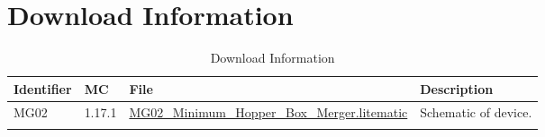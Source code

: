 \documentclass[10pt]{datasheet}
\begin{document}
\section{Download Information}
\begin{table}[H]
    \caption{Download Information}
    \begin{tabularx}{\textwidth}{l | l | l | X}
        \thickhline
        \textbf{Identifier} & \textbf{MC} & \textbf{File} & \textbf{Description} \\
        \hline
        MG02 & 1.17.1 & \href{https://github.com/Soontech-Annals/Archive/blob/b56572c0d2b4f182d9e9d41449d8cb2963b923ae/Archive/merging/MG02\%20Minimum\%20Hopper\%20Box\%20Merger/MG02\_Minimum\_Hopper\_Box\_Merger.litematic?raw=1}{MG02\_Minimum\_Hopper\_Box\_Merger.litematic} & Schematic of device. \\
        \hline
        \thickhline
    \end{tabularx}
\end{table}
\end{document}
